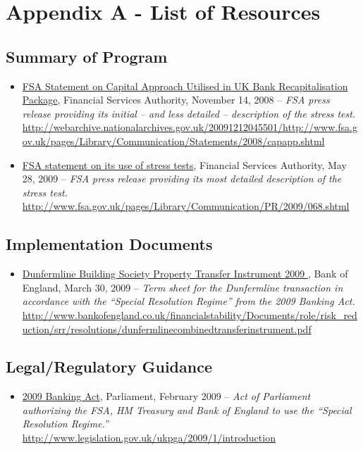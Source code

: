 \section{Appendix A - List of Resources}

\subsection{Summary of Program}

\begin{itemize}
\item
\ul{FSA Statement on Capital Approach Utilised in UK Bank Recapitalisation Package}, Financial Services Authority, November 14, 2008 -- \emph{FSA press release providing its initial -- and less detailed -- description of the stress test.} \url{http://webarchive.nationalarchives.gov.uk/20091212045501/http://www.fsa.gov.uk/pages/Library/Communication/Statements/2008/capapp.shtml}
\item
\ul{FSA statement on its use of stress tests}, Financial Services Authority, May 28, 2009 -- \emph{FSA press release providing its most detailed description of the stress test.} \url{http://www.fsa.gov.uk/pages/Library/Communication/PR/2009/068.shtml}
\end{itemize}

\subsection{Implementation Documents}
\begin{itemize}
\item
\ul{Dunfermline Building Society Property Transfer Instrument 2009 }, Bank of England, March 30, 2009 -- \emph{Term sheet for the Dunfermline transaction in accordance with the ``Special Resolution Regime'' from the 2009 Banking Act.} \url{http://www.bankofengland.co.uk/financialstability/Documents/role/risk_reduction/srr/resolutions/dunfermlinecombinedtransferinstrument.pdf}
\end{itemize}

\subsection{Legal/Regulatory Guidance}

\begin{itemize}
\item
\ul{2009 Banking Act}, Parliament, February 2009 -- \emph{Act of Parliament authorizing the FSA, HM Treasury and Bank of England to use the ``Special Resolution Regime.''} \url{http://www.legislation.gov.uk/ukpga/2009/1/introduction}
\end{itemize}

